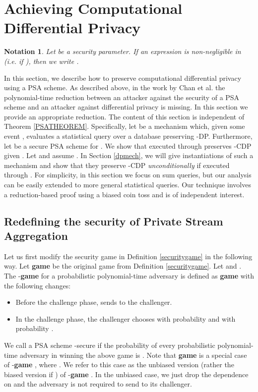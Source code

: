 \documentclass[10pt]{extarticle}
\newtheorem{Ntn}{Notation}
\begin{document}
\section{Achieving Computational Differential Privacy}\label{cdp}

\begin{Ntn} Let  be a security parameter. If an expression  is non-negligible in  (i.e. if ), then we write .
\end{Ntn}

In this section, we describe how to preserve computational differential privacy using a PSA scheme. As described above, in the work by Chan et al. \cite{3} the polynomial-time reduction between an attacker against the security of a PSA scheme and an attacker against differential privacy is missing. In this section we provide an appropriate reduction. The content of this section is independent of Theorem \ref{PSATHEOREM}. Specifically, let  be a mechanism which, given some event , evaluates a statistical query  over a database  preserving -\mbox{\upshape\sffamily DP}. Furthermore, let  be a secure PSA scheme for . We show that  executed through  preserves -\mbox{\upshape\sffamily CDP} given . Let  and assume . In Section \ref{dpmech}, we will give instantiations of such a mechanism  and show that they preserve -\mbox{\upshape\sffamily CDP} \textit{unconditionally} if executed through . For simplicity, in this section we focus on sum queries, but our analysis can be easily extended to more general statistical queries. Our technique involves a reduction-based proof using a biased coin toss and is of independent interest.

\subsection{Redefining the security of Private Stream Aggregation}
Let us first modify the security game in Definition \ref{securitygame} in the following way. Let \textbf{game}  be the original game from Definition \ref{securitygame}. Let  and . The -\textbf{game}  for a probabilistic polynomial-time adversary  is defined as \textbf{game}  with the following changes:
\begin{itemize}
 \item Before the challenge phase,  sends  to the challenger.
 \item In the challenge phase, the challenger chooses  with probability  and  with probability .
\end{itemize}
We call a PSA scheme -secure if the probability of every probabilistic polynomial-time adversary  in winning the above game is . Note that \textbf{game}  is a special case of -\textbf{game} , where . We refer to this case as the unbiased version (rather the biased version if ) of -\textbf{game} . In the unbiased case, we just drop the dependence on  and the adversary is not required to send  to its challenger.
\end{document}
